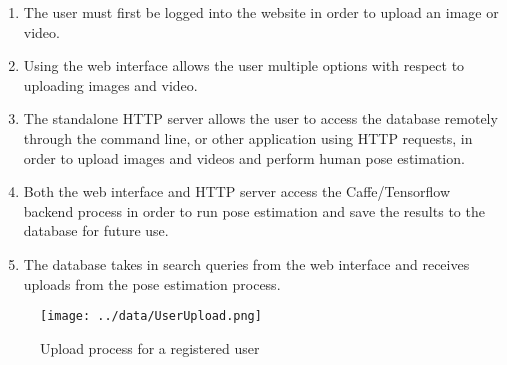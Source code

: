 \documentclass{scrreprt}
\begin{document}
\begin{enumerate}
  \item The user must first be logged into the website in order to upload an image or video.
  \item Using the web interface allows the user multiple options with respect to uploading images and video.
  \item The standalone HTTP server allows the user to access the database
        remotely through the command line, or other application using HTTP
        requests, in order to upload images and videos and perform human pose
        estimation.
  \item Both the web interface and HTTP server access the Caffe/Tensorflow backend process in order to run pose estimation and save the results to the database for future use.
  \item The database takes in search queries from the web interface and receives uploads from the pose estimation process.
\end{enumerate}


\begin{figure}[!ht]
        \caption{Upload process for a registered user}
        \label{mediaUpload}
        \centering
        \texttt{[image: ../data/UserUpload.png]}
\end{figure}
\end{document}
